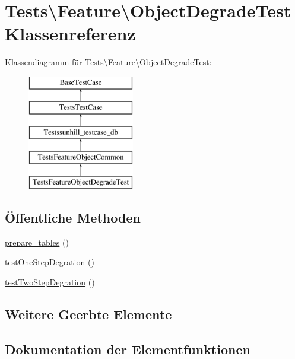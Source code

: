 \hypertarget{classTests_1_1Feature_1_1ObjectDegradeTest}{}\section{Tests\textbackslash{}Feature\textbackslash{}Object\+Degrade\+Test Klassenreferenz}
\label{classTests_1_1Feature_1_1ObjectDegradeTest}
Klassendiagramm für Tests\textbackslash{}Feature\textbackslash{}Object\+Degrade\+Test\+:\begin{figure}[H]
\begin{center}
\leavevmode
\includegraphics[height=5.000000cm]{df/d0f/classTests_1_1Feature_1_1ObjectDegradeTest}
\end{center}
\end{figure}
\subsection*{Öffentliche Methoden}
\begin{DoxyCompactItemize}
\item 
\hyperlink{classTests_1_1Feature_1_1ObjectDegradeTest_a9f61c515f9511daa6c17926756638f51}{prepare\+\_\+tables} ()
\item 
\hyperlink{classTests_1_1Feature_1_1ObjectDegradeTest_ad22ca8b13554ba451bda167e49a04da8}{test\+One\+Step\+Degration} ()
\item 
\hyperlink{classTests_1_1Feature_1_1ObjectDegradeTest_a2d448486857c85c2afcde9fdfc5f9d0f}{test\+Two\+Step\+Degration} ()
\end{DoxyCompactItemize}
\subsection*{Weitere Geerbte Elemente}


\subsection{Dokumentation der Elementfunktionen}
\mbox{\label{classTests_1_1Feature_1_1ObjectDegradeTest_a9f61c515f9511daa6c17926756638f51}} 
